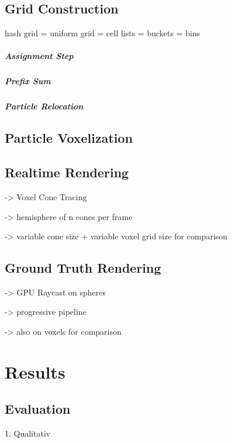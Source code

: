 \documentclass[hyperref,german,diplominf]{cgvpub}
\begin{document}
\section{Grid Construction}

hash grid = uniform grid = cell lists = buckets = bins

\paragraph{Assignment Step}

\paragraph{Prefix Sum}

\paragraph{Particle Relocation}

\section{Particle Voxelization}

\section{Realtime Rendering}

-> Voxel Cone Tracing

-> hemisphere of n cones per frame

-> variable cone size + variable voxel grid size for comparison

\section{Ground Truth Rendering}

-> GPU Raycast on spheres

-> progressive pipeline

-> also on voxels for comparison

\chapter{Results}

\section{Evaluation}

1. Qualitativ
\end{document}
